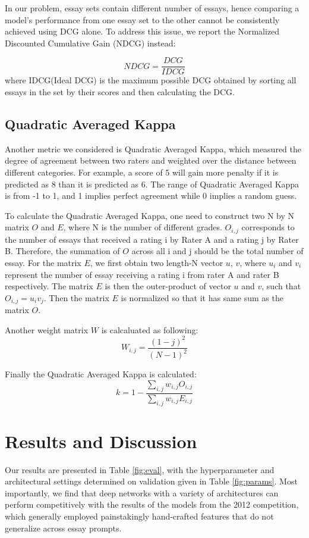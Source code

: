 \documentclass[10pt,psamsfonts]{amsart}
\theoremstyle{definition}
\theoremstyle{remark}
\numberwithin{equation}{section}
\begin{document}
In our problem, essay sets contain different number of essays, hence comparing a model's performance from one essay set to the other cannot be consistently achieved using DCG alone. To address this issue, we report the Normalized Discounted Cumulative Gain (NDCG) instead:

$$NDCG=\frac{DCG}{IDCG}$$
where IDCG(Ideal DCG) is the maximum possible DCG obtained by sorting all essays in the set by their scores and then calculating the DCG.

\subsection*{Quadratic Averaged Kappa}
Another metric we considered is Quadratic Averaged Kappa, which measured the degree of agreement between two raters and weighted over the distance between different categories. For example, a score of 5 will gain more penalty if it is predicted as 8 than it is predicted as 6. The range of Quadratic Averaged Kappa is from -1 to 1, and 1 implies perfect agreement while 0 implies a random guess. 

To calculate the Quadratic Averaged Kappa, one need to construct two N by N matrix $O$ and $E$, where N is the number of different grades. $O_{i,j}$ corresponds to the number of essays that received a rating i by Rater A and a rating j by Rater B. Therefore, the summation of $O$ across all i and j should be the total number of essay. For the matrix $E$, we first obtain two length-N vector $u$, $v$, where $u_i$ and $v_i$ represent the number of essay receiving a rating i from rater A and rater B respectively. The matrix $E$ is then the outer-product of vector $u$ and $v$, such that $O_{i,j} = u_i v_j$. Then the matrix $E$ is normalized so that it has same sum as the matrix $O$.

Another weight matrix $W$ is calcaluated as following:
$$
W_{i,j} = \frac{(1-j)^2}{(N-1)^2}
$$

Finally the Quadratic Averaged Kappa is calculated:
$$
k = 1 - \frac{\sum_{i,j}w_{i,j}O_{i,j}}{\sum_{i,j}w_{i,j}E_{i,j}}
$$




\section*{Results and Discussion}

Our results are presented in Table \ref{fig:eval}, with the hyperparameter and architectural settings determined on validation given in Table \ref{fig:params}. Most importantly, we find that deep networks with a variety of architectures can perform competitively with the results of the models from the 2012 competition, which generally employed painstakingly hand-crafted features that do not generalize across essay prompts.
\end{document}
